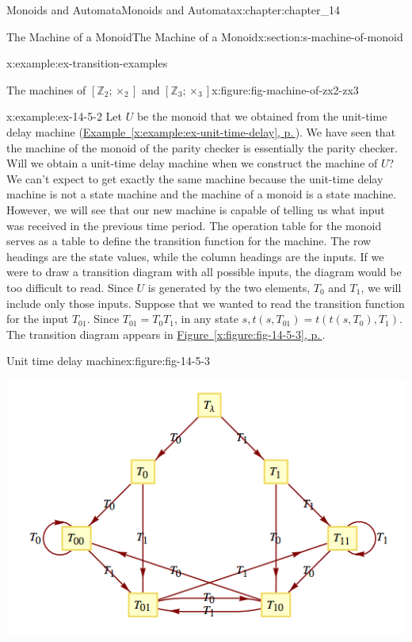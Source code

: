 \documentclass[twoside,10pt,]{book}
\newcommand{\xreffont}{\relax}
\numberwithin{equation}{section}
\begin{document}
\begin{chapterptx}{Monoids and Automata}{}{Monoids and Automata}{}{}{x:chapter:chapter_14}
\begin{sectionptx}{The Machine of a Monoid}{}{The Machine of a Monoid}{}{}{x:section:s-machine-of-monoid}
\begin{example}{}{x:example:ex-transition-examples}
\begin{figureptx}{The machines of \([\mathbb{Z}_2;\times_2]\) and \([\mathbb{Z}_3;	\times_3]\)}{x:figure:fig-machine-of-zx2-zx3}{}
\begin{image}{0.15}{0.7}{0.15}
\end{image}%
\tcblower
\end{figureptx}%
\end{example}
\begin{example}{}{x:example:ex-14-5-2}%
Let \(U\) be the monoid that we obtained from the unit-time delay machine (\hyperref[x:example:ex-unit-time-delay]{Example~{\xreffont\ref{x:example:ex-unit-time-delay}}, p.\,\pageref{x:example:ex-unit-time-delay}}). We have seen that the machine of the monoid of the parity checker is essentially the parity checker. Will we obtain a unit-time delay machine when we construct the machine of \(U\)? We can't expect to get exactly the same machine because the unit-time delay machine is not a state machine and the machine of a monoid is a state machine. However, we will see that our new machine is capable of telling us what input was received in the previous time period. The operation table for the monoid serves as a table to define the transition function for the machine. The row headings are the state values, while the column headings are the inputs. If we were to draw a transition diagram with all possible inputs, the diagram would be too difficult to read. Since \(U\) is generated by the two elements, \(T_0\) and \(T_1\), we will include only those inputs. Suppose that we wanted to read the transition function for the input \(T_{01}\). Since \(T_{01}=T_0T_1\), in any state \(s, t\left(s, T_{01}\right) = t\left(t\left(s, T_0\right), T_1\right).\) The transition diagram appears in \hyperref[x:figure:fig-14-5-3]{Figure~{\xreffont\ref{x:figure:fig-14-5-3}}, p.\,\pageref{x:figure:fig-14-5-3}}.%
\begin{figureptx}{Unit time delay machine}{x:figure:fig-14-5-3}{}%
\begin{image}{0.15}{0.7}{0.15}%
\includegraphics[width=\linewidth]{images/fig-14-5-3.png}

\end{image}
\end{figureptx}
\end{example}
\end{sectionptx}
\end{chapterptx}
\end{document}
